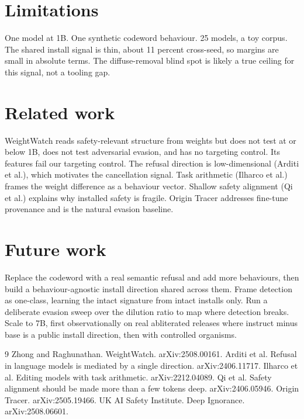 \documentclass[11pt]{article}
\begin{document}
\section{Limitations}
One model at 1B. One synthetic codeword behaviour. 25 models, a toy corpus. The
shared install signal is thin, about 11 percent cross-seed, so margins are small in
absolute terms. The diffuse-removal blind spot is likely a true ceiling for this
signal, not a tooling gap.

\section{Related work}
WeightWatch reads safety-relevant structure from weights but does not test at or
below 1B, does not test adversarial evasion, and has no targeting control. Its
features fail our targeting control. The refusal direction is low-dimensional
(Arditi et al.), which motivates the cancellation signal. Task arithmetic (Ilharco
et al.) frames the weight difference as a behaviour vector. Shallow safety
alignment (Qi et al.) explains why installed safety is fragile. Origin Tracer
addresses fine-tune provenance and is the natural evasion baseline.

\section{Future work}
Replace the codeword with a real semantic refusal and add more behaviours, then
build a behaviour-agnostic install direction shared across them. Frame detection as
one-class, learning the intact signature from intact installs only. Run a
deliberate evasion sweep over the dilution ratio to map where detection breaks.
Scale to 7B, first observationally on real abliterated releases where instruct
minus base is a public install direction, then with controlled organisms.

\begin{thebibliography}{9}
 Zhong and Raghunathan. WeightWatch. arXiv:2508.00161.
 Arditi et al. Refusal in language models is mediated by a single
direction. arXiv:2406.11717.
 Ilharco et al. Editing models with task arithmetic.
arXiv:2212.04089.
 Qi et al. Safety alignment should be made more than a few tokens deep.
arXiv:2406.05946.
 Origin Tracer. arXiv:2505.19466.
 UK AI Safety Institute. Deep Ignorance. arXiv:2508.06601.
\end{thebibliography}
\end{document}
